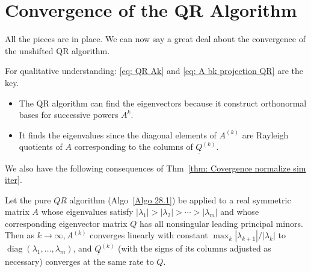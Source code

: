 \section{Convergence of the QR Algorithm} 
 All the pieces are in place. We can now say a great deal about the convergence of the unshifted QR algorithm. 

 For qualitative understanding: \eqref{eq: QR Ak} and \eqref{eq: A bk projection QR} are the key.  
\begin{itemize}
    \item The QR algorithm can find the eigenvectors because it construct orthonormal bases for successive powers $A^{k}$. 
    \item It finds the eigenvalues since the diagonal elements of $ A^{(k)} $ are Rayleigh quotients of $A$ corresponding to the columns of $\underline Q ^{(k)}$.  
\end{itemize}

We also have the following consequences of Thm~\ref{thm: Covergence normalize sim iter}.  


\begin{theorem}
\label{thm: convergence of pure QR}
Let the pure $Q R$ algorithm (Algo~\ref{Algo 28.1}) be applied to a real symmetric matrix $A$ whose eigenvalues satisfy $\left|\lambda_1\right|>\left|\lambda_2\right|>\cdots>\left|\lambda_m\right|$ and whose corresponding eigenvector matrix $Q$ has all nonsingular leading principal minors. Then as $k \rightarrow \infty, A^{(k)}$ converges linearly with constant $\max _k\left|\lambda_{k+1}\right| /\left|\lambda_k\right|$ to $\operatorname{diag}\left(\lambda_1, \ldots, \lambda_m\right)$, and $\underline{Q}^{(k)}$ (with the signs of its columns adjusted as necessary) converges at the same rate to $Q$.
\end{theorem}

